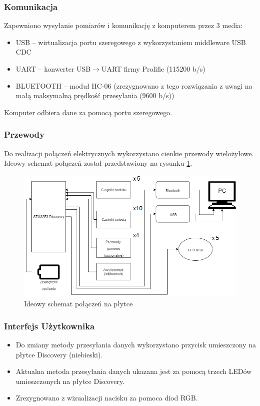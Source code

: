 \documentclass[12pt,a4paper]{article}
\begin{document}
\subsubsection{Komunikacja}
Zapewniono wysyłanie pomiarów i komunikację z komputerem przez 3 media:
\begin{itemize}
\item USB -- wirtualizacja portu szeregowego z wykorzystaniem middleware USB CDC
\item UART -- konwerter USB$\rightarrow$UART firmy Prolific (115200 b/s)
\item BLUETOOTH -- moduł HC-06 (zrezygnowano z tego rozwiązania z uwagi na małą maksymalną prędkość przesyłania (9600 b/s))
\end{itemize}
Komputer odbiera dane za pomocą portu szeregowego.

\subsubsection{Przewody}
Do realizacji połączeń elektrycznych wykorzystano cienkie przewody wielożyłowe. Ideowy schemat połączeń został przedstawiony na rysunku \ref{fig:kabelki}.
\begin{figure}[!htb]
\centering
\includegraphics[width=.75\textwidth]{./images/SchematIdeowy.png}
\caption{Ideowy schemat połączeń na płytce \label{fig:kabelki}}
\end{figure}

\subsubsection{Interfejs Użytkownika}
\begin{itemize}

\item Do zmiany metody przesyłania danych wykorzystano przycisk umieszczony na płytce Discovery (niebieski). 
\item Aktualna metoda przesyłania danych ukazana jest za pomocą trzech LEDów umieszczonych na płytce Discovery.
\item Zrezygnowano z wizualizacji nacisku za pomoca diod RGB.
\end{itemize}
\end{document}
